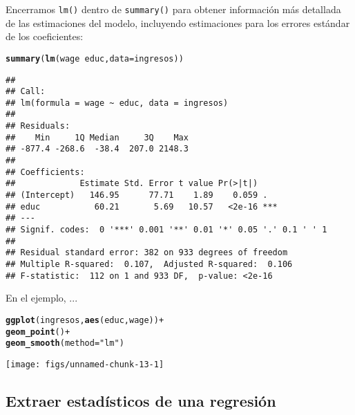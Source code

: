 \documentclass{report}\usepackage[]{graphicx}\usepackage[]{color}
\makeatletter
\newcommand{\hlstr}[1]{\textcolor[rgb]{0.192,0.494,0.8}{#1}}%
\newcommand{\hlopt}[1]{\textcolor[rgb]{0,0,0}{#1}}%
\newcommand{\hlstd}[1]{\textcolor[rgb]{0.345,0.345,0.345}{#1}}%
\newcommand{\hlkwc}[1]{\textcolor[rgb]{0.333,0.667,0.333}{#1}}%
\newcommand{\hlkwd}[1]{\textcolor[rgb]{0.737,0.353,0.396}{\textbf{#1}}}%
\newenvironment{kframe}{%
 \def\at@end@of@kframe{}%
 \ifinner\ifhmode%
  \def\at@end@of@kframe{\end{minipage}}%
  \begin{minipage}{\columnwidth}%
 \fi\fi%
 \def\FrameCommand##1{\hskip\@totalleftmargin \hskip-\fboxsep
 \colorbox{shadecolor}{##1}\hskip-\fboxsep
     \hskip-\linewidth \hskip-\@totalleftmargin \hskip\columnwidth}%
 \MakeFramed {\advance\hsize-\width
   \@totalleftmargin\z@ \linewidth\hsize
   \@setminipage}}%
 {\par\unskip\endMakeFramed%
 \at@end@of@kframe}
\newenvironment{knitrout}{}{} %
\makeatother
\begin{document}
Encerramos \verb|lm()| dentro de \verb|summary()| para obtener información más detallada de las estimaciones del modelo, incluyendo estimaciones para los errores estándar de los coeficientes:

\begin{knitrout}
\color{fgcolor}\begin{kframe}
\begin{alltt}
\hlkwd{summary}\hlstd{(}\hlkwd{lm}\hlstd{(wage} \hlopt{~} \hlstd{educ,} \hlkwc{data} \hlstd{= ingresos))}
\end{alltt}
\begin{verbatim}
## 
## Call:
## lm(formula = wage ~ educ, data = ingresos)
## 
## Residuals:
##    Min     1Q Median     3Q    Max 
## -877.4 -268.6  -38.4  207.0 2148.3 
## 
## Coefficients:
##             Estimate Std. Error t value Pr(>|t|)    
## (Intercept)   146.95      77.71    1.89    0.059 .  
## educ           60.21       5.69   10.57   <2e-16 ***
## ---
## Signif. codes:  0 '***' 0.001 '**' 0.01 '*' 0.05 '.' 0.1 ' ' 1
## 
## Residual standard error: 382 on 933 degrees of freedom
## Multiple R-squared:  0.107,	Adjusted R-squared:  0.106 
## F-statistic:  112 on 1 and 933 DF,  p-value: <2e-16
\end{verbatim}
\end{kframe}
\end{knitrout}

En el ejemplo, ...


\begin{knitrout}
\color{fgcolor}\begin{kframe}
\begin{alltt}
\hlkwd{ggplot}\hlstd{(ingresos,} \hlkwd{aes}\hlstd{(educ, wage))} \hlopt{+}
  \hlkwd{geom_point}\hlstd{()} \hlopt{+}
  \hlkwd{geom_smooth}\hlstd{(}\hlkwc{method} \hlstd{=} \hlstr{"lm"}\hlstd{)}
\end{alltt}
\end{kframe}

{\centering \texttt{[image: figs/unnamed-chunk-13-1]} 

}



\end{knitrout}


\subsection{Extraer estadísticos de una regresión}
\end{document}
